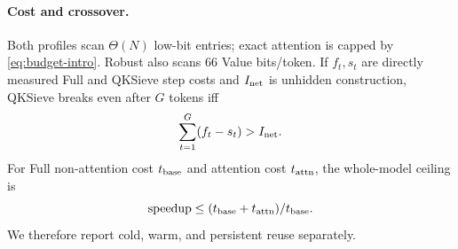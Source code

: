 \paragraph{Cost and crossover.}
Both profiles scan $\Theta(N)$ low-bit entries; exact attention is capped by
\cref{eq:budget-intro}.  Robust also scans 66 Value bits/token.  If $f_t,s_t$
are directly measured Full and QKSieve step costs and $I_{\rm net}$ is
unhidden construction, QKSieve breaks even after $G$ tokens iff
\begin{equation}
 \sum_{t=1}^{G}(f_t-s_t)>I_{\rm net}.
 \label{eq:main-break-even}
\end{equation}
For Full non-attention cost $t_{\rm base}$ and attention cost $t_{\rm attn}$,
the whole-model ceiling is
\begin{equation}
 \mathrm{speedup}\le(t_{\rm base}+t_{\rm attn})/t_{\rm base}.
 \label{eq:main-amdahl}
\end{equation}
We therefore report cold, warm, and persistent reuse separately.
